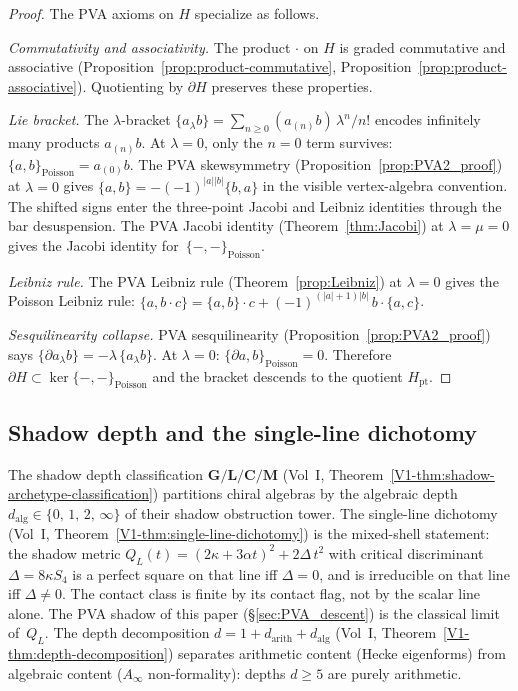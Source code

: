 \begin{proof}
The PVA axioms on $H$ specialize as follows.

\emph{Commutativity and associativity.}
The product $\cdot$ on $H$ is graded commutative and associative
(Proposition~\ref{prop:product-commutative},
Proposition~\ref{prop:product-associative}). Quotienting by $\partial H$
preserves these properties.

\emph{Lie bracket.}
The $\lambda$-bracket $\{a {}_\lambda b\} = \sum_{n \geq 0}
(a_{(n)} b)\, \lambda^n / n!$ encodes infinitely many products
$a_{(n)} b$. At $\lambda = 0$, only the $n = 0$ term survives:
$\{a, b\}_{\mathrm{Poisson}} = a_{(0)} b$. The PVA skewsymmetry
(Proposition~\ref{prop:PVA2_proof}) at $\lambda = 0$ gives
$\{a, b\} = -(-1)^{|a||b|}\{b, a\}$ in the visible
vertex-algebra convention. The shifted signs enter the three-point
Jacobi and Leibniz identities through the bar desuspension. The PVA
Jacobi identity (Theorem~\ref{thm:Jacobi}) at $\lambda = \mu = 0$
gives the Jacobi identity for~$\{-,-\}_{\mathrm{Poisson}}$.

\emph{Leibniz rule.}
The PVA Leibniz rule (Theorem~\ref{prop:Leibniz}) at $\lambda = 0$
gives the Poisson Leibniz rule:
$\{a, b \cdot c\} = \{a, b\} \cdot c +
(-1)^{(|a|+1)|b|}\, b \cdot \{a, c\}$.

\emph{Sesquilinearity collapse.}
PVA sesquilinearity (Proposition~\ref{prop:PVA2_proof}) says
$\{\partial a {}_\lambda b\} = -\lambda\, \{a {}_\lambda b\}$.
At $\lambda = 0$: $\{\partial a, b\}_{\mathrm{Poisson}} = 0$.
Therefore $\partial H \subset \ker\{-,-\}_{\mathrm{Poisson}}$
and the bracket descends to the quotient $H_{\mathrm{pt}}$.
\end{proof}

\subsection{Shadow depth and the single-line dichotomy}

The shadow depth classification
$\mathbf{G}/\mathbf{L}/\mathbf{C}/\mathbf{M}$
(Vol~I, Theorem~\ref*{V1-thm:shadow-archetype-classification})
partitions chiral algebras by the algebraic depth
$d_{\mathrm{alg}} \in \{0,\,1,\,2,\,\infty\}$ of their
shadow obstruction tower. The single-line dichotomy
(Vol~I, Theorem~\ref*{V1-thm:single-line-dichotomy})
is the mixed-shell statement: the shadow metric
$Q_L(t) = (2\kappa{+}3\alpha t)^2 + 2\Delta\,t^2$
with critical discriminant $\Delta = 8\kappa S_4$
is a perfect square on that line iff $\Delta = 0$, and
is irreducible on that line iff $\Delta \neq 0$.  The contact
class is finite by its contact flag, not by the scalar line alone.
The PVA shadow of this paper
(\S\ref{sec:PVA_descent}) is the classical limit of~$Q_L$.
The depth decomposition
$d = 1 + d_{\mathrm{arith}} + d_{\mathrm{alg}}$
(Vol~I, Theorem~\ref*{V1-thm:depth-decomposition})
separates arithmetic content (Hecke eigenforms) from
algebraic content ($A_\infty$ non-formality):
depths $d \geq 5$ are purely arithmetic.

